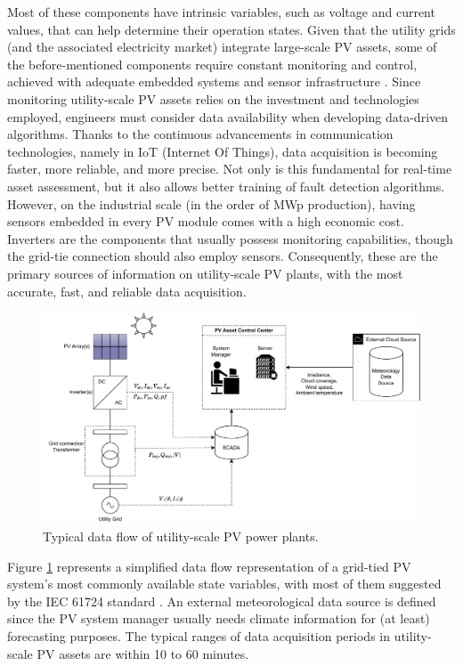 Most of these components have intrinsic variables, such as voltage and current values, that can help determine their operation states. Given that the utility grids (and the associated electricity market) integrate large-scale PV assets, some of the before-mentioned components require constant monitoring and control, achieved with adequate embedded systems and sensor infrastructure \cite{AIPV}. Since monitoring utility-scale PV assets relies on the investment and technologies employed, engineers must consider data availability when developing data-driven algorithms. Thanks to the continuous advancements in communication technologies, namely in IoT (Internet Of Things), data acquisition is becoming faster, more reliable, and more precise. Not only is this fundamental for real-time asset assessment, but it also allows better training of fault detection algorithms. However, on the industrial scale (in the order of MWp production), having sensors embedded in every PV module comes with a high economic cost. Inverters are the components that usually possess monitoring capabilities, though the grid-tie connection should also employ sensors. Consequently, these are the primary sources of information on utility-scale PV plants, with the most accurate, fast, and reliable data acquisition.

\begin{figure}[h!]
    \centering
    \includegraphics[width=\linewidth]{figures/chapter2/pvdata.drawio.pdf}
    \caption{Typical data flow of utility-scale PV power plants.}
    \label{fig:pvdataflow}
\end{figure}

Figure \ref{fig:pvdataflow} represents a simplified data flow representation of a grid-tied PV system's most commonly available state variables, with most of them suggested by the IEC 61724 standard \cite{iec61724}. An external meteorological data source is defined since the PV system manager usually needs climate information for (at least) forecasting purposes. The typical ranges of data acquisition periods in utility-scale PV assets are within 10 to 60 minutes.


